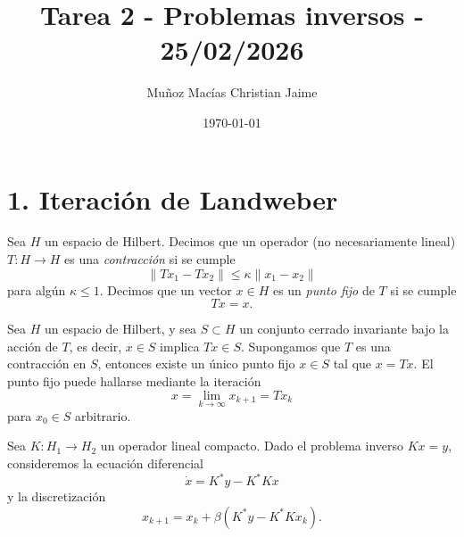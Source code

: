 \documentclass[12pt,spanish,mexico]{article}
\title{Tarea 2 - Problemas inversos - 25/02/2026}
\author{Muñoz Macías Christian Jaime}
\date{\today}
\numberwithin{equation}{section}
\theoremstyle{definition}
\theoremstyle{remark}
\begin{document}
\maketitle

\section*{1. Iteración de Landweber}

Sea \( H \) un espacio de Hilbert. Decimos que un operador (no necesariamente lineal) \( T : H \to H \) es una \textit{contracción} si se cumple
\[
\|Tx_1 - Tx_2\| \le \kappa \|x_1 - x_2\|
\]
para algún \( \kappa \le 1 \). Decimos que un vector \( x \in H \) es un \textit{punto fijo} de \( T \) si se cumple
\[
Tx = x.
\]

\begin{proposicion}
Sea \( H \) un espacio de Hilbert, y sea \( S \subset H \) un conjunto cerrado invariante bajo la acción de \( T \), es decir, \( x \in S \) implica \( Tx \in S \). Supongamos que \( T \) es una contracción en \( S \), entonces existe un único punto fijo \( x \in S \) tal que \( x = Tx \). El punto fijo puede hallarse mediante la iteración
\[
x = \lim_{k \to \infty} x_{k+1} = Tx_k
\]
para \( x_0 \in S \) arbitrario.
\end{proposicion}

Sea \( K : H_1 \to H_2 \) un operador lineal compacto. Dado el problema inverso \( Kx = y \), consideremos la ecuación diferencial
\[
\dot{x} = K^*y - K^*Kx
\]
y la discretización
\[
x_{k+1} = x_k + \beta(K^*y - K^*Kx_k). \tag{1}
\]
\end{document}
